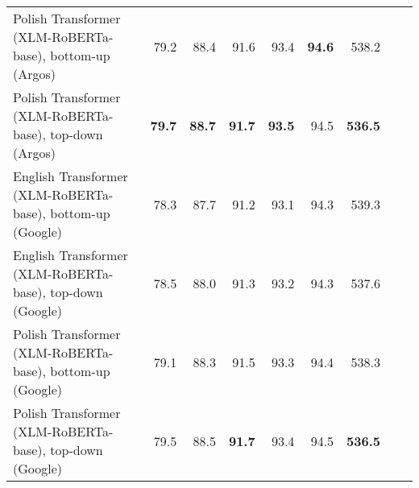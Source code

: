 \begin{table}[ht!]
{\begin{tabular}{lrrrrrrrr}
  Polish Transformer (XLM-RoBERTa-base), bottom-up (Argos) & 79.2 & 88.4 & 91.6 & 93.4 & \textbf{94.6} & 538.2 \\ 
  Polish Transformer (XLM-RoBERTa-base), top-down (Argos) & \textbf{79.7} & \textbf{88.7} & \textbf{91.7} & \textbf{93.5} & 94.5 & \textbf{536.5} \\ 
  English Transformer (XLM-RoBERTa-base), bottom-up (Google) & 78.3 & 87.7 & 91.2 & 93.1 & 94.3 & 539.3 \\ 
  English Transformer (XLM-RoBERTa-base), top-down (Google) & 78.5 & 88.0 & 91.3 & 93.2 & 94.3 & 537.6 \\ 
  Polish Transformer (XLM-RoBERTa-base), bottom-up (Google) & 79.1 & 88.3 & 91.5 & 93.3 & 94.4 & 538.3 \\ 
  Polish Transformer (XLM-RoBERTa-base), top-down (Google) & 79.5 & 88.5 & \textbf{91.7} & 93.4 & 94.5 & \textbf{536.5} \\ 
   \hline
\end{tabular}
}
\end{table}




